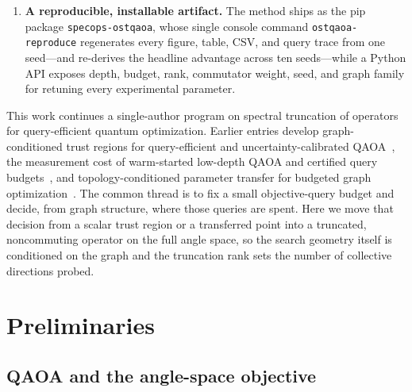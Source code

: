 \documentclass[aps,prxquantum,reprint,amsmath,amssymb,floatfix,nofootinbib,superscriptaddress,longbibliography]{revtex4-2}
\theoremstyle{remark}
\newcommand{\QAOA}{\textnormal{\textsc{QAOA}}}
\begin{document}
\begin{enumerate}
\cref{tab:headline}), and across ten seeds (\(160\) paired instances) improves by
\(+0.104\pm0.012\), positive on every seed with \(153/160\) instance wins and a
\(2.3\times\) query reduction (\cref{fig:robust}).  A truncation sweep exhibits
the predicted interior optimum \(n^{\star}{=}4\) (\cref{fig:sweep}), and an
ablation localizes the gain to the noncommuting off-diagonal directions
(\(-0.009\) mean ratio when restricted to the diagonal; \cref{sec:synthetic}).
The operational query-budget scaling of \cref{rem:query} is stated as an explicit
heuristic under a coverage assumption and tested, not asserted.
\item \textbf{A reproducible, installable artifact.}  The method ships as the pip
package \texttt{specops-ostqaoa}, whose single console command
\texttt{ostqaoa-reproduce} regenerates every figure, table, CSV, and query trace
from one seed---and re-derives the headline advantage across ten seeds---while a
Python API exposes depth, budget, rank, commutator weight, seed, and graph family
for retuning every experimental parameter.
\end{enumerate}

This work continues a single-author program on spectral truncation of
operators for query-efficient quantum optimization.  Earlier entries develop
graph-conditioned trust regions for query-efficient and uncertainty-calibrated
\QAOA{}~\cite{huynh2026gctr,huynh2026gctrcalpro}, the
measurement cost of warm-started low-depth \QAOA{} and certified query
budgets~\cite{huynh2026meascost,huynh2026certqb}, and topology-conditioned
parameter transfer for budgeted graph
optimization~\cite{huynh2026paramxferB}.
The common thread
is to fix a small objective-query budget and decide, from graph structure, where
those queries are spent.  Here we move that decision from a scalar trust region
or a transferred point into a truncated, noncommuting operator on the full angle
space, so the search geometry itself is conditioned on the graph and the
truncation rank sets the number of collective directions probed.

\section{Preliminaries}
\label{sec:prelim}

\subsection{QAOA and the angle-space objective}
\label{sec:qaoa}
\end{document}
